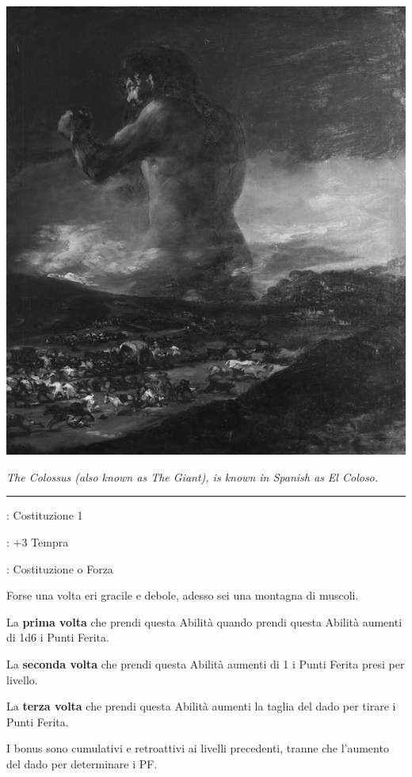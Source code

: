 \begin{multicols}{2}
\begin{center}
	\includegraphics[width=0.65\linewidth]{immagini/elcolosso.png}

	\emph{The Colossus (also known as The Giant), is known in Spanish as El Coloso.}
\end{center}

\smallskip\noindent\rule{\linewidth}{2pt} \hypertarget{Montagna umana}{}\medskip{}
\noindent
\begin{description}[noitemsep, topsep=0pt, parsep=0pt, partopsep=0pt, leftmargin=0cm, labelwidth=2.5cm]
    \item[\textbf{Requisito}]: Costituzione 1
    \item[\textbf{Tiri Salvezza}]: +3 Tempra
    \item[\textbf{Caratteristica}]: Costituzione o Forza
\end{description}

Forse una volta eri gracile e debole, adesso sei una montagna di muscoli.

La \textbf{prima volta} che prendi questa Abilità quando prendi questa Abilità aumenti di 1d6 i Punti Ferita.

La \textbf{seconda volta} che prendi questa Abilità aumenti di 1 i Punti Ferita presi per livello.

La \textbf{terza volta} che prendi questa Abilità aumenti la taglia del dado per tirare i Punti Ferita.

I bonus sono cumulativi e retroattivi ai livelli precedenti, tranne che l'aumento del dado per determinare i PF.


\end{multicols}

